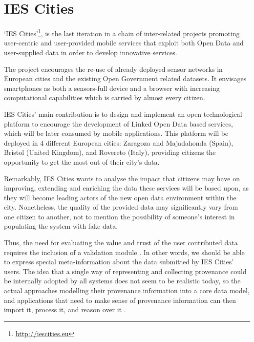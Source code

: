 \section{IES Cities}
\label{sec:ies_cities}

`IES Cities'\footnote{\url{http://iescities.eu}}, is the last iteration in a chain of inter-related projects promoting user-centric and user-provided mobile services that exploit both Open Data and user-supplied data in order to develop innovative services.

The project encourages the re-use of already deployed sensor networks in European cities and the existing Open Government related datasets. It envisages smartphones as both a sensors-full device and a browser with increasing computational capabilities which is carried by almost every citizen.

IES Cities' main contribution is to design and implement an open technological platform to encourage the development of Linked Open Data based services, which will be later consumed by mobile applications. This platform will be deployed in 4 different European cities: Zaragoza and Majadahonda (Spain), Bristol (United Kingdom), and Rovereto (Italy), providing citizens the opportunity to get the most out of their city's data.

Remarkably, IES Cities wants to analyse the impact that citizens may have on improving, extending and enriching the data these services will be based upon, as they will become leading actors of the new open data environment within the city. Nonetheless, the quality of the provided data may significantly vary from one citizen to another, not to mention the possibility of someone's interest in populating the system with fake data.

Thus, the need for evaluating the value and trust of the user contributed data requires the inclusion of a validation module \cite{hartig_publishing_2010}. In other words, we should be able to express special meta-information about the data submitted by IES Cities' users. The idea that a single way of representing and collecting provenance could be internally adopted by all systems does not seem to be realistic today, so the actual approaches modelling their provenance information into a core data model, and applications that need to make sense of provenance information can then import it, process it, and reason over it \cite{ceolin_trust_2012}.

